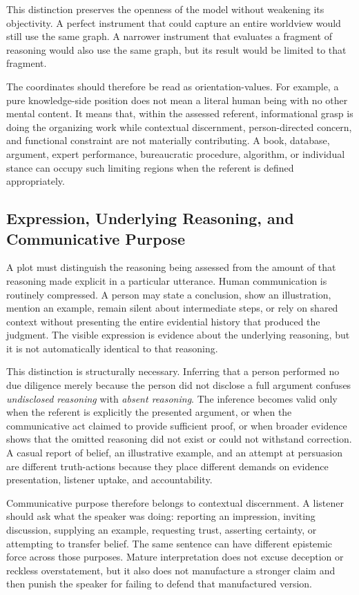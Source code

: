 \documentclass[11pt]{article}
\begin{document}
This distinction preserves the openness of the model without weakening its objectivity. A perfect instrument that could capture an entire worldview would still use the same graph. A narrower instrument that evaluates a fragment of reasoning would also use the same graph, but its result would be limited to that fragment.

The coordinates should therefore be read as orientation-values. For example, a pure knowledge-side position does not mean a literal human being with no other mental content. It means that, within the assessed referent, informational grasp is doing the organizing work while contextual discernment, person-directed concern, and functional constraint are not materially contributing. A book, database, argument, expert performance, bureaucratic procedure, algorithm, or individual stance can occupy such limiting regions when the referent is defined appropriately.

\subsection{Expression, Underlying Reasoning, and Communicative Purpose}

A plot must distinguish the reasoning being assessed from the amount of that reasoning made explicit in a particular utterance. Human communication is routinely compressed. A person may state a conclusion, show an illustration, mention an example, remain silent about intermediate steps, or rely on shared context without presenting the entire evidential history that produced the judgment. The visible expression is evidence about the underlying reasoning, but it is not automatically identical to that reasoning.

This distinction is structurally necessary. Inferring that a person performed no due diligence merely because the person did not disclose a full argument confuses \emph{undisclosed reasoning} with \emph{absent reasoning}. The inference becomes valid only when the referent is explicitly the presented argument, or when the communicative act claimed to provide sufficient proof, or when broader evidence shows that the omitted reasoning did not exist or could not withstand correction. A casual report of belief, an illustrative example, and an attempt at persuasion are different truth-actions because they place different demands on evidence presentation, listener uptake, and accountability.

Communicative purpose therefore belongs to contextual discernment. A listener should ask what the speaker was doing: reporting an impression, inviting discussion, supplying an example, requesting trust, asserting certainty, or attempting to transfer belief. The same sentence can have different epistemic force across those purposes. Mature interpretation does not excuse deception or reckless overstatement, but it also does not manufacture a stronger claim and then punish the speaker for failing to defend that manufactured version.
\end{document}
